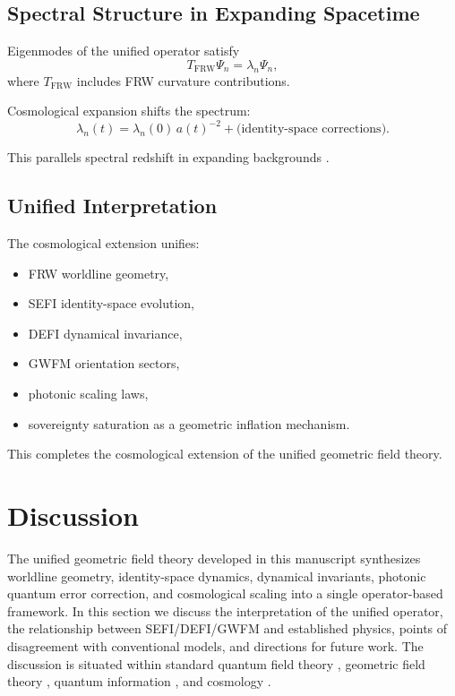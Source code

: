 \documentclass[aip,jmp,reprint,onecolumn,nofootinbib]{revtex4-2}
\begin{document}
\subsection{Spectral Structure in Expanding Spacetime}

Eigenmodes of the unified operator satisfy
\begin{equation}
T_{\mathrm{FRW}} \Psi_n = \lambda_n \Psi_n,
\end{equation}
where $T_{\mathrm{FRW}}$ includes FRW curvature contributions.

Cosmological expansion shifts the spectrum:
\begin{equation}
\lambda_n(t) = \lambda_n(0) \, a(t)^{-2} + \text{(identity-space corrections)}.
\end{equation}

This parallels spectral redshift in expanding backgrounds 
\cite{Peebles,Dodelson}.

\subsection{Unified Interpretation}

The cosmological extension unifies:
\begin{itemize}
\item FRW worldline geometry,
\item SEFI identity-space evolution,
\item DEFI dynamical invariance,
\item GWFM orientation sectors,
\item photonic scaling laws,
\item sovereignty saturation as a geometric inflation mechanism.
\end{itemize}

This completes the cosmological extension of the unified geometric field theory.
\section{Discussion}

The unified geometric field theory developed in this manuscript synthesizes worldline 
geometry, identity-space dynamics, dynamical invariants, photonic quantum error correction, 
and cosmological scaling into a single operator-based framework. In this section we discuss 
the interpretation of the unified operator, the relationship between SEFI/DEFI/GWFM and 
established physics, points of disagreement with conventional models, and directions for 
future work. The discussion is situated within standard quantum field theory 
\cite{WeinbergQFT1,PeskinSchroeder}, geometric field theory \cite{Nakahara,Frankel}, 
quantum information \cite{GottesmanQEC,PreskillQEC}, and cosmology 
\cite{WeinbergCosmo,Dodelson,Peebles}.
\end{document}
